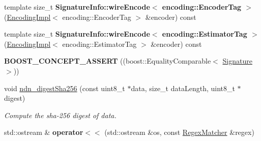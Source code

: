 \begin{DoxyCompactItemize}
\item 
template size\+\_\+t {\bfseries Signature\+Info\+::wire\+Encode$<$ encoding\+::\+Encoder\+Tag $>$} (\hyperlink{classndn_1_1encoding_1_1EncodingImpl}{Encoding\+Impl}$<$ encoding\+::\+Encoder\+Tag $>$ \&encoder) const\hypertarget{namespacendn_ab64395e5661eaa9205aa77be18a589e8}{}\label{namespacendn_ab64395e5661eaa9205aa77be18a589e8}

\item 
template size\+\_\+t {\bfseries Signature\+Info\+::wire\+Encode$<$ encoding\+::\+Estimator\+Tag $>$} (\hyperlink{classndn_1_1encoding_1_1EncodingImpl}{Encoding\+Impl}$<$ encoding\+::\+Estimator\+Tag $>$ \&encoder) const\hypertarget{namespacendn_a51b9d679bf738a9f469f966f4b7e3975}{}\label{namespacendn_a51b9d679bf738a9f469f966f4b7e3975}

\item 
{\bfseries B\+O\+O\+S\+T\+\_\+\+C\+O\+N\+C\+E\+P\+T\+\_\+\+A\+S\+S\+E\+RT} ((boost\+::\+Equality\+Comparable$<$ \hyperlink{classndn_1_1Signature}{Signature} $>$))\hypertarget{namespacendn_ae9043b88d3a87a593beed5806a422cba}{}\label{namespacendn_ae9043b88d3a87a593beed5806a422cba}

\item 
void \hyperlink{namespacendn_a37c0076af2dfd200fe0fcc1bc463d9bf}{ndn\+\_\+digest\+Sha256} (const uint8\+\_\+t $\ast$data, size\+\_\+t data\+Length, uint8\+\_\+t $\ast$digest)
\begin{DoxyCompactList}\small\item\em Compute the sha-\/256 digest of data. \end{DoxyCompactList}\item 
std\+::ostream \& {\bfseries operator$<$$<$} (std\+::ostream \&os, const \hyperlink{classndn_1_1RegexMatcher}{Regex\+Matcher} \&regex)\hypertarget{namespacendn_aaafa01a6cc1601aa8782765457275fee}{}\label{namespacendn_aaafa01a6cc1601aa8782765457275fee}


\end{DoxyCompactItemize}
